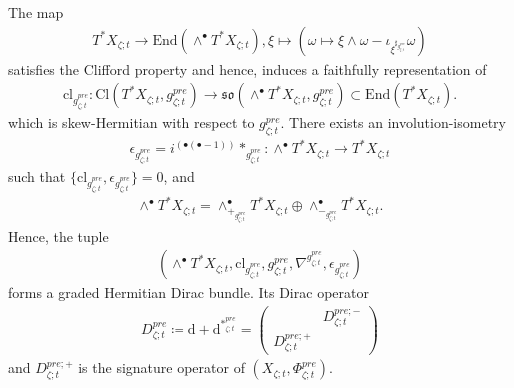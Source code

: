 \documentclass[psamsfonts]{amsart}
\theoremstyle{plain}
\theoremstyle{definition}{
\newtheorem{defi}{Definition}[section]
\newtheorem{ass}{Assumption}
\newtheorem*{nota}{Notation}}
\theoremstyle{remark}{
\newtheorem{rem}{Remark}
\newtheorem{ex}{Example}}
\theoremstyle{plain}{
\newtheorem{thm}{Theorem}[section]
\newtheorem{lem}{Lemma}[section]
\newtheorem{cor}{Corollary}[section]
\newtheorem{prop}{Proposition}[section]
\newtheorem{con}{Conjecture}[section]}
\newcommand{\m}[1]{{\mathrm{#1}}}
\begin{document}
The map 
\begin{align*}
    T^*X_{\zeta;t}\rightarrow \m{End}(\wedge^\bullet T^*X_{\zeta;t}),\xi\mapsto\left(\omega\mapsto \xi\wedge\omega-\iota_{\xi^{\sharp_{g^{pre}_{\zeta;t}}}}\omega\right) 
\end{align*}
satisfies the Clifford property and hence, induces a faithfully representation of
\begin{align*}
    \m{cl}_{g^{pre}_{\zeta;t}} \colon\m{Cl}(T^*X_{\zeta;t},g^{pre}_{\zeta;t})\rightarrow\mathfrak{so}(\wedge^\bullet T^*X_{\zeta;t},g^{pre}_{\zeta;t})\subset\m{End}(T^*X_{\zeta;t}).
\end{align*}
which is skew-Hermitian with respect to $g^{pre}_{\zeta;t}$. There exists an involution-isometry
\begin{align*}
    \epsilon_{g^{pre}_{\zeta;t}}=i^{(\bullet(\bullet-1))}*_{g^{pre}_{\zeta;t}} \colon\wedge^\bullet T^*X_{\zeta;t}\rightarrow T^*X_{\zeta;t}
\end{align*}
such that $\{\m{cl}_{g^{pre}_{\zeta;t}},\epsilon_{g^{pre}_{\zeta;t}}\}=0$, and 
\begin{align*}
    \wedge^\bullet T^*X_{\zeta;t}=\wedge^\bullet_{+_{g^{pre}_{\zeta;t}}}T^*X_{\zeta;t}\oplus \wedge^\bullet_{-_{g^{pre}_{\zeta;t}}}T^*X_{\zeta;t}.
\end{align*}
Hence, the tuple 
\begin{align*}
    (\wedge^\bullet T^*X_{\zeta;t},\m{cl}_{g^{pre}_{\zeta;t}},g^{pre}_{\zeta;t},\nabla^{g^{pre}_{\zeta;t}},\epsilon_{g^{pre}_{\zeta;t}})
\end{align*}
forms a graded Hermitian Dirac bundle. Its Dirac operator 
\begin{align*}
    D_{\zeta;t}^{pre}\coloneqq \m{d}+\m{d}^{*^{pre}_{\zeta;t}}=\left(\begin{array}{cc}
         &D_{\zeta;t}^{pre;-}  \\
         D_{\zeta;t}^{pre;+}& 
    \end{array}\right)
\end{align*}
and $D_{\zeta;t}^{pre;+}$ is the signature operator of $(X_{\zeta;t},\Phi^{pre}_{\zeta;t})$.\\
\end{document}
